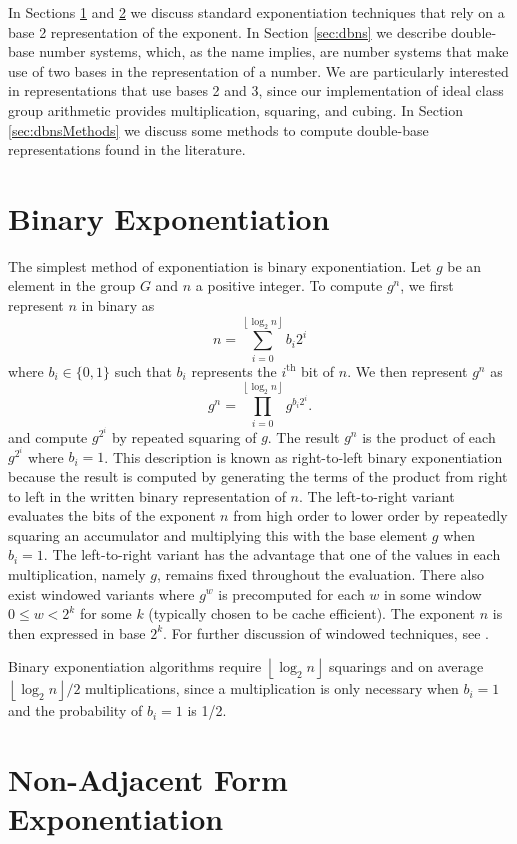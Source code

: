 \documentclass{ucalgthes1}
\theoremstyle{definition}
\newcommand{\floor}[1]{\left\lfloor #1 \right\rfloor}
\begin{document}
In Sections \ref{sec:binaryExp} and \ref{sec:naf} we discuss standard exponentiation techniques that rely on a base 2 representation of the exponent.  In Section \ref{sec:dbns} we describe double-base number systems, which, as the name implies, are number systems that make use of two bases in the representation of a number.  We are particularly interested in representations that use bases 2 and 3, since our implementation of ideal class group arithmetic provides multiplication, squaring, and cubing. In Section \ref{sec:dbnsMethods} we discuss some methods to compute double-base representations found in the literature.  

\bigbreak
\section{Binary Exponentiation}
\label{sec:binaryExp}
The simplest method of exponentiation is binary exponentiation.  Let $g$ be an element in the group $G$ and $n$ a positive integer.  To compute $g^n$, we first represent $n$ in binary as
\[
	n = \sum_{i=0}^{\floor{\log_2 n}} b_i 2^i
\]
where $b_i \in \{0, 1\}$ such that $b_i$ represents the $i^{\textrm{th}}$ bit of $n$.  We then represent $g^n$ as
\[
	g^n = \prod_{i=0}^{\floor{\log_2 n}} g^{b_i 2^i}.
\]
and compute $g^{2^i}$ by repeated squaring of $g$.  The result $g^n$ is the product of each $g^{2^i}$ where $b_i = 1$.  This description is known as right-to-left binary exponentiation because the result is computed by generating the terms of the product from right to left in the written binary representation of $n$.  The left-to-right variant evaluates the bits of the exponent $n$ from high order to lower order by repeatedly squaring an accumulator and multiplying this with the base element $g$ when $b_i = 1$.  The left-to-right variant has the advantage that one of the values in each multiplication, namely $g$, remains fixed throughout the evaluation.  There also exist windowed variants where $g^w$ is precomputed for each $w$ in some window $0 \le w < 2^k$ for some $k$ (typically chosen to be cache efficient). The exponent $n$ is then expressed in base $2^k$.  For further discussion of windowed techniques, see \cite{Cohen2006}.

Binary exponentiation algorithms require $\floor{\log_2 n}$ squarings and on average $\floor{\log_2 n}/2$ multiplications, since a multiplication is only necessary when $b_i = 1$ and the probability of $b_i = 1$ is 1/2.


\bigbreak
\section{Non-Adjacent Form Exponentiation}
\label{sec:naf}
\end{document}
